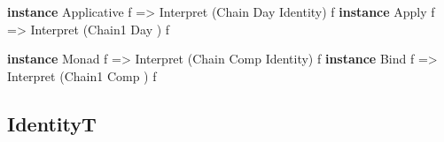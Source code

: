 \documentclass[]{article}
\newenvironment{Shaded}{}{}
\newcommand{\DataTypeTok}[1]{\textcolor[rgb]{0.56,0.13,0.00}{#1}}
\newcommand{\KeywordTok}[1]{\textcolor[rgb]{0.00,0.44,0.13}{\textbf{#1}}}
\newcommand{\NormalTok}[1]{#1}
\newcommand{\OtherTok}[1]{\textcolor[rgb]{0.00,0.44,0.13}{#1}}
\begin{document}
\begin{itemize}
\begin{Shaded}
\begin{Highlighting}[]
\KeywordTok{instance} \DataTypeTok{Applicative}\NormalTok{ f }\OtherTok{=>} \DataTypeTok{Interpret}\NormalTok{ (}\DataTypeTok{Chain}  \DataTypeTok{Day} \DataTypeTok{Identity}\NormalTok{) f}
\KeywordTok{instance} \DataTypeTok{Apply}\NormalTok{       f }\OtherTok{=>} \DataTypeTok{Interpret}\NormalTok{ (}\DataTypeTok{Chain1} \DataTypeTok{Day}\NormalTok{         ) f}

\KeywordTok{instance} \DataTypeTok{Monad}\NormalTok{ f }\OtherTok{=>} \DataTypeTok{Interpret}\NormalTok{ (}\DataTypeTok{Chain}  \DataTypeTok{Comp} \DataTypeTok{Identity}\NormalTok{) f}
\KeywordTok{instance} \DataTypeTok{Bind}\NormalTok{  f }\OtherTok{=>} \DataTypeTok{Interpret}\NormalTok{ (}\DataTypeTok{Chain1} \DataTypeTok{Comp}\NormalTok{         ) f}
\end{Highlighting}
\end{Shaded}
\end{itemize}

\hypertarget{identityt}{%
\subsection{IdentityT}\label{identityt}}
\end{document}

